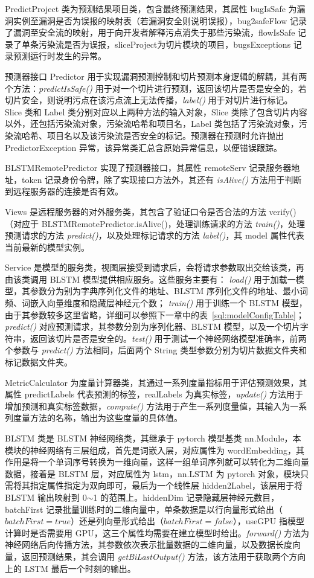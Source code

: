 PredictProject 类为预测结果项目类，包含最终预测结果，其属性 bugIsSafe 为漏洞实例至漏洞是否为误报的映射表（若漏洞安全则说明误报），bug2safeFlow 记录了漏洞至安全流的映射，用于向开发者解释污点消失于那些污染流，flowIsSafe 记录了单条污染流是否为误报，sliceProject为切片模块的项目，bugsExceptions 记录预测运行时发生的异常。

预测器接口 Predictor 用于实现漏洞预测控制和切片预测本身逻辑的解耦，其有两个方法：\textit{predictIsSafe()} 用于对一个切片进行预测，返回该切片是否是安全的，若切片安全，则说明污点在该污点流上无法传播，\textit{label()} 用于对切片进行标记。Slice 类和 Label 类分别对应以上两种方法的输入对象，Slice 类除了包含切片内容以外，还包括污染流对象，污染流哈希和项目名，Label 类包括了污染流对象，污染流哈希、项目名以及该污染流是否安全的标记。预测器在预测时允许抛出 PredictorException 异常，该异常类汇总含原始异常信息，以便错误跟踪。

BLSTMRemotePredictor 实现了预测器接口，其属性 remoteServ 记录服务器地址，token 记录身份令牌，除了实现接口方法外，其还有 \textit{isAlive()} 方法用于判断到远程服务器的连接是否有效。

Views 是远程服务器的对外服务类，其包含了验证口令是否合法的方法 verify()（对应于 BLSTMRemotePredictor.isAlive()，处理训练请求的方法 \textit{train()}，处理预测请求的方法 \textit{predict()}，以及处理标记请求的方法 \textit{label()}，其 model 属性代表当前最新的模型实例。

Service 是模型的服务类，视图层接受到请求后，会将请求参数取出交给该类，再由该类调用 BLSTM 模型提供相应服务。这些服务主要有： \textit{load()} 用于加载一模型，其参数分为别为字典序列化文件的地址、BLSTM 序列化文件的地址、最小词频、词嵌入向量维度和隐藏层神经元个数； \textit{train()} 用于训练一个 BLSTM 模型，由于其参数较多这里省略，详细可以参照下一章中的表~\ref{sql:modelConfigTable}； \textit{predict()} 对应预测请求，其参数分别为序列化器、BLSTM 模型，以及一个切片字符串，返回该切片是否是安全的。\textit{test()} 用于测试一个神经网络模型准确率，前两个参数与 \textit{predict()} 方法相同，后面两个 String 类型参数分别为切片数据文件夹和标记数据文件夹。

MetricCalculator 为度量计算器类，其通过一系列度量指标用于评估预测效果，其属性 predictLabels 代表预测的标签，realLabels 为真实标签，\textit{update()} 方法用于增加预测和真实标签数据，\textit{compute()} 方法用于产生一系列度量值，其输入为一系列度量方法的名称，输出为这些度量的具体值。

BLSTM 类是 BLSTM 神经网络类，其继承于 pytorch 模型基类 nn.Module，本模块的神经网络有三层组成，首先是词嵌入层，对应属性为 wordEmbedding，其作用是将一个单词序号转换为一维向量，这样一组单词序列就可以转化为二维向量数据，接着是 BLSTM 层，对应属性为 lstm，nn.LSTM 为 pytorch 对象，模块只需将其指定属性指定为双向即可，最后为一个线性层 hidden2Label，该层用于将 BLSTM 输出映射到 0$\sim$1 的范围上。hiddenDim 记录隐藏层神经元数目，batchFirst 记录批量训练时的二维向量中，单条数据是以行向量形式给出（$batchFirst=true$）还是列向量形式给出（$batchFirst=false$），useGPU 指模型计算时是否需要用 GPU，这三个属性均需要在建立模型时给出。\textit{forward()} 方法为神经网络后向传播方法，其参数依次表示批量数据的二维向量，以及数据长度向量，返回预测结果，其会调用 \textit{getBiLastOutput()} 方法，该方法用于获取两个方向上的 LSTM 最后一个时刻的输出。\\

